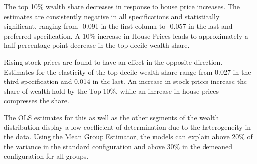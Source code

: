 \documentclass[
  a4paper,
  DIV=11,
  numbers=noendperiod]{scrartcl}
\begin{document}
The top 10\% wealth share decreases in response to house price
increases. The estimates are consistently negative in all specifications
and statistically significant, ranging from -0.091 in the first column
to -0.057 in the last and preferred specification. A 10\% increase in
House Prices leads to approximately a half percentage point decrease in
the top decile wealth share.

Rising stock prices are found to have an effect in the opposite
direction. Estimates for the elasticity of the top decile wealth share
range from 0.027 in the third specification and 0.014 in the last. An
increase in stock prices increase the share of wealth hold by the Top
10\%, while an increase in house prices compresses the share.

The OLS estimates for this as well as the other segments of the wealth
distribution display a low coefficient of determination due to the
heterogeneity in the data. Using the Mean Group Estimator, the models
can explain above 20\% of the variance in the standard configuration and
above 30\% in the demeaned configuration for all groups.

\begin{table}

\caption{\label{tbl-panelM40}Middle 40\% Panel Regression}


\end{table}%
\end{document}
